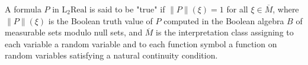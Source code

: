 A formula $P$ in $\mathrm{L}_2\mathrm{Real}$ is said to be "true" if $\|P\|(\xi) = 1$ for all $\xi \in \overline{M}$, where $\|P\|(\xi)$ is the Boolean truth value of $P$ computed in the Boolean algebra $B$ of measurable sets modulo null sets, and $\overline{M}$ is the interpretation class assigning to each variable a random variable and to each function symbol a function on random variables satisfying a natural continuity condition.